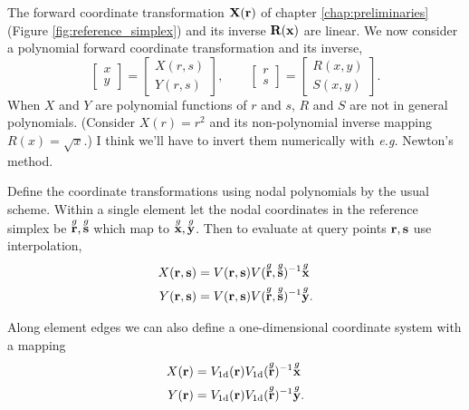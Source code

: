 The forward coordinate transformation $\textbf{X}(\textbf{r})$ of chapter \ref{chap:preliminaries} (Figure \ref{fig:reference_simplex}) and its inverse $\textbf{R}(\textbf{x})$ are linear.  We now consider a polynomial forward coordinate transformation and its inverse,
%
\begin{equation}
\begin{bmatrix}
x \\ y
\end{bmatrix}
=
\begin{bmatrix}
X(r, s) \\ Y(r,s)
\end{bmatrix},
\qquad
\begin{bmatrix}
r \\ s
\end{bmatrix}
=
\begin{bmatrix}
R(x, y) \\ S(x,y)
\end{bmatrix}.
\end{equation}
%
When $X$ and $Y$ are polynomial functions of $r$ and $s$, $R$ and $S$ are not in general polynomials.  (Consider $X(r) = r^2$ and its non-polynomial inverse mapping $R(x) = \sqrt{x}$.)  I think we'll have to invert them numerically with \emph{e.g.} Newton's method.

Define the coordinate transformations using nodal polynomials by the usual scheme.  Within a single element let the nodal coordinates in the reference simplex be $\overset{g}{\textbf{r}}, \overset{g}{\textbf{s}}$ which map to $\overset{g}{\textbf{x}}, \overset{g}{\textbf{y}}$.  Then to evaluate at query points $\textbf{r}, \textbf{s}$ use interpolation,
%
\begin{equation}
\begin{aligned}
X(\textbf{r}, \textbf{s}) &= V(\textbf{r}, \textbf{s}) V(\overset{g}{\textbf{r}}, \overset{g}{\textbf{s}})^{-1} \overset{g}{\textbf{x}} \\
Y(\textbf{r}, \textbf{s}) &= V(\textbf{r}, \textbf{s}) V(\overset{g}{\textbf{r}}, \overset{g}{\textbf{s}})^{-1} \overset{g}{\textbf{y}}.
\end{aligned}
\end{equation}

Along element edges we can also define a one-dimensional coordinate system with a mapping
%
\begin{equation}
\begin{aligned}
X(\textbf{r}) &= V_\textrm{1d}(\textbf{r}) V_\textrm{1d}(\overset{g}{\textbf{r}})^{-1} \overset{g}{\textbf{x}} \\
Y(\textbf{r}) &= V_\textrm{1d}(\textbf{r}) V_\textrm{1d}(\overset{g}{\textbf{r}})^{-1} \overset{g}{\textbf{y}}.
\end{aligned}
\end{equation}


